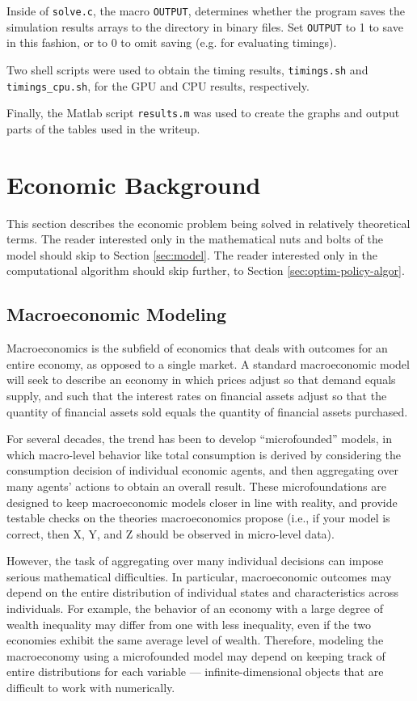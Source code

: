 \documentclass[a4paper,12pt]{article}
\numberwithin{equation}{section}
\theoremstyle{definition}
\begin{document}
Inside of \texttt{solve.c}, the macro \texttt{OUTPUT}, determines
whether the program saves the simulation results arrays to the
directory in binary files. Set \texttt{OUTPUT} to 1 to save in this
fashion, or to 0 to omit saving (e.g. for evaluating timings).

Two shell scripts were used to obtain the timing results,
\texttt{timings.sh} and \texttt{timings\_cpu.sh}, for the GPU and CPU
results, respectively.

Finally, the Matlab script \texttt{results.m} was used to create the
graphs and output parts of the tables used in the writeup.

\section{Economic Background}
\label{sec:economic-background}

This section describes the economic problem being solved in relatively
theoretical terms. The reader interested only in the mathematical nuts
and bolts of the model should skip to Section \ref{sec:model}. The
reader interested only in the computational algorithm should skip
further, to Section \ref{sec:optim-policy-algor}.

\subsection{Macroeconomic Modeling}

Macroeconomics is the subfield of economics that deals with outcomes
for an entire economy, as opposed to a single market. A standard
macroeconomic model will seek to describe an economy in which prices
adjust so that demand equals supply, and such that the interest rates
on financial assets adjust so that the quantity of financial assets
sold equals the quantity of financial assets purchased.

For several decades, the trend has been to develop ``microfounded''
models, in which macro-level behavior like total consumption is
derived by considering the consumption decision of individual economic
agents, and then aggregating over many agents' actions to obtain an
overall result. These microfoundations are designed to keep
macroeconomic models closer in line with reality, and provide testable
checks on the theories macroeconomics propose (i.e., if your model is
correct, then X, Y, and Z should be observed in micro-level data).

However, the task of aggregating over many individual decisions can
impose serious mathematical difficulties. In particular, macroeconomic
outcomes may depend on the entire distribution of individual states
and characteristics across individuals. For example, the behavior of
an economy with a large degree of wealth inequality may differ from
one with less inequality, even if the two economies exhibit the same
average level of wealth. Therefore, modeling the macroeconomy using a
microfounded model may depend on keeping track of entire distributions
for each variable --- infinite-dimensional objects that are difficult
to work with numerically.
\end{document}
